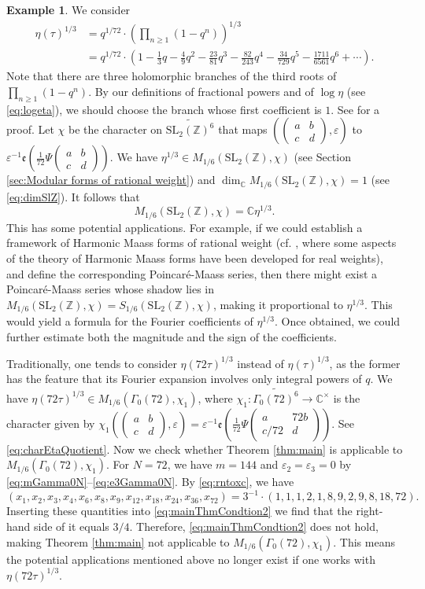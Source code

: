 \documentclass[12pt]{amsart}
\numberwithin{equation}{section}
\theoremstyle{plain}
\theoremstyle{definition}
\newtheorem{examp}[thm]{Example}
\theoremstyle{remark}
\newcommand\tbtmat[4]{\left(\begin{smallmatrix}{#1} & {#2} \\ {#3} & {#4}\end{smallmatrix}\right)}
\newcommand\etp[1]{\mathfrak{e}\left(#1\right)}
\newcommand\numC{\mathbb{C}}
\newcommand\slZ{\mathrm{SL}_2(\mathbb{Z})}
\newcommand\elesltRaDs[5]{\left(\left(\begin{smallmatrix}{#1} & {#2} \\ {#3} & {#4}\end{smallmatrix}\right),{#5}\right)}
\newcommand\Dcover[2]{\widetilde{#1^{#2}}}
\begin{document}
\begin{examp}
We consider
\begin{align*}
\eta(\tau)^{1/3}&=q^{1/72}\cdot\left(\prod_{n\geq1}(1-q^n)\right)^{1/3}\\
&=q^{1/72}\cdot\left(1-\frac{1}{3}q-\frac{4}{9}q^2-\frac{23}{81}q^3-\frac{82}{243}q^4-\frac{34}{729}q^5-\frac{1711}{6561}q^6+\cdots\right).
\end{align*}
Note that there are three holomorphic branches of the third roots of $\prod_{n\geq1}(1-q^n)$. By our definitions of fractional powers and of $\log\eta$ (see \eqref{eq:logeta}), we should choose the branch whose first coefficient is $1$. See \cite[Remark 4.3]{Zhu23} for a proof. Let $\chi$ be the character on $\Dcover{\slZ}{6}$ that maps $\elesltRaDs{a}{b}{c}{d}{\varepsilon}$ to $\varepsilon^{-1}\etp{\frac{1}{72}\Psi\tbtmat{a}{b}{c}{d}}$. We have $\eta^{1/3}\in M_{1/6}(\slZ, \chi)$ (see Section \ref{sec:Modular forms of rational weight}) and $\dim_\numC M_{1/6}(\slZ, \chi)=1$ (see \eqref{eq:dimSlZ}). It follows that
\begin{equation}
\label{eq:basisM16slZ}
M_{1/6}(\slZ, \chi)=\numC\eta^{1/3}.
\end{equation}
This has some potential applications. For example, if we could establish a framework of Harmonic Maass forms of rational weight (cf. \cite[Section 2]{LL23}, where some aspects of the theory of Harmonic Maass forms have been developed for real weights), and define the corresponding Poincar\'e-Maass series, then there might exist a Poincar\'e-Maass series whose shadow lies in $M_{1/6}(\slZ, \chi)=S_{1/6}(\slZ, \chi)$, making it proportional to $\eta^{1/3}$. This would yield a formula for the Fourier coefficients of $\eta^{1/3}$. Once obtained, we could further estimate both the magnitude and the sign of the coefficients.

Traditionally, one tends to consider $\eta(72\tau)^{1/3}$ instead of $\eta(\tau)^{1/3}$, as the former has the feature that its Fourier expansion involves only integral powers of $q$. We have $\eta(72\tau)^{1/3}\in M_{1/6}(\Gamma_0(72), \chi_1)$, where $\chi_1\colon\Dcover{\Gamma_0(72)}{6}\rightarrow\numC^\times$ is the character given by $\chi_1\elesltRaDs{a}{b}{c}{d}{\varepsilon}=\varepsilon^{-1}\etp{\frac{1}{72}\Psi\tbtmat{a}{72b}{c/72}{d}}$. See \eqref{eq:charEtaQuotient}. Now we check whether Theorem \ref{thm:main} is applicable to $M_{1/6}(\Gamma_0(72), \chi_1)$. For $N=72$, we have $m=144$ and $\varepsilon_2=\varepsilon_3=0$ by \eqref{eq:mGamma0N}--\eqref{eq:e3Gamma0N}. By \eqref{eq:rntoxc}, we have
\begin{equation*}
(x_1, x_2, x_3, x_4, x_6, x_8, x_9, x_{12}, x_{18}, x_{24}, x_{36}, x_{72})=3^{-1}\cdot(1,1,1,2,1,8,9,2,9,8,18,72).
\end{equation*}
Inserting these quantities into \eqref{eq:mainThmCondtion2} we find that the right-hand side of it equals $3/4$. Therefore, \eqref{eq:mainThmCondtion2} does not hold, making Theorem \ref{thm:main} not applicable to $M_{1/6}(\Gamma_0(72), \chi_1)$. This means the potential applications mentioned above no longer exist if one works with $\eta(72\tau)^{1/3}$.
\end{examp}
\end{document}
